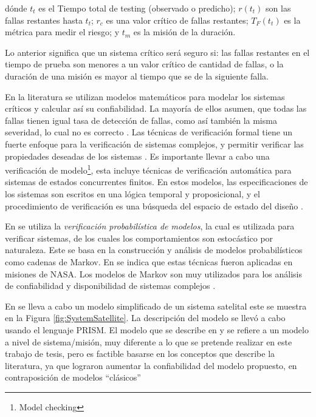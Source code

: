   dónde $t_t$ es el Tiempo total de testing (observado o predicho); $r(t_t)$ son las fallas restantes hasta $t_t$; $r_c$ es una valor crítico de fallas restantes; $T_F(t_t)$ es la métrica para medir el riesgo; y $t_m$ es la misión de la duración.

  Lo anterior significa que un sistema crítico será seguro si: las fallas restantes en el tiempo de prueba son menores a un valor crítico de cantidad de fallas, o la duración de una misión es mayor al tiempo que se de la siguiente falla.
  
  En la literatura se utilizan modelos matemáticos para modelar los sistemas críticos y calcular así su confiabilidad. La mayoría de ellos asumen, que todas las fallas tienen igual tasa de detección de fallas, como así también la misma severidad, lo cual no es correcto \citep{Liu14}. Las técnicas de verificación formal tiene un fuerte enfoque para la verificación de sistemas complejos, y permitir verificar las propiedades deseadas de los sistemas \citep{Peng13}. Es importante llevar a cabo una verificación de modelo\footnote{Model checking}, esta incluye técnicas de verificación automática para sistemas de estados concurrentes finitos. En estos modelos, las especificaciones de los sistemas son escritos en una lógica temporal y proposicional, y el procedimiento de verificación es una búsqueda del espacio de estado del diseño \citep{Hoque15}.

  En \cite{Hoque15} se utiliza la \textit{verificación probabilística de modelos}, la cual es utilizada para verificar sistemas, de los cuales los comportamientos son estocástico por naturaleza. Este se basa en la construcción y análisis de modelos probabilísticos como cadenas de Markov. En \cite{Hoque15} se indica que estas técnicas fueron aplicadas en misiones de \ac{NASA}. Los modelos de Markov son muy utilizados para los análisis de confiabilidad y disponibilidad de sistemas complejos \citep{Hoque15}.

  En \cite{Hoque15} se lleva a cabo un modelo simplificado de un sistema satelital este se muestra en la Figura \ref{fig:SystemSatellite}. La descripción del modelo se llevó a cabo usando el lenguaje PRISM. El modelo que se describe en \cite{Hoque15} y \cite{Peng13} se refiere a un modelo a nivel de sistema/misión, muy diferente a lo que se pretende realizar en este trabajo de tesis, pero es factible basarse en los conceptos que describe la literatura, ya que lograron aumentar la confiabilidad del modelo propuesto, en contraposición de modelos ``clásicos''

